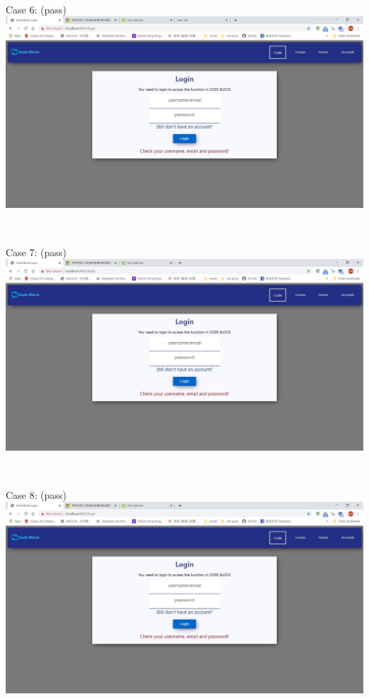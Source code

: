 ~

Case 6: (pass)\\
\includegraphics[scale=0.45]{Doc/Pics/case-5-2-6}

~

Case 7: (pass)\\
\includegraphics[scale=0.45]{Doc/Pics/case-5-2-7}

~

Case 8: (pass)\\
\includegraphics[scale=0.45]{Doc/Pics/case-5-2-8}

